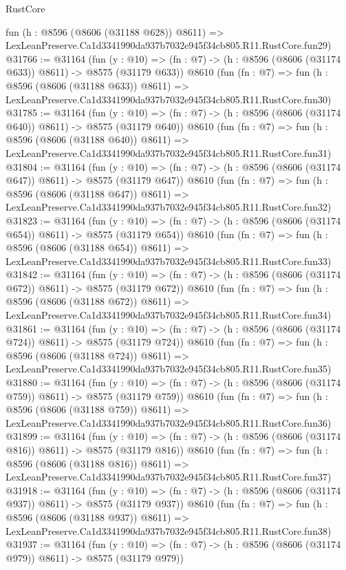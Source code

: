 \begin{lexlean}{RustCore}
\begin{coremodule}
    fun (h : @8596 (@8606 (@31188 @628)) @8611) =>
    LexLeanPreserve.Ca1d3341990da937b7032e945f34cb805.R11.RustCore.fun29)
@31766 := @31164
    (fun (y : @10) => (fn : @7) -> (h : @8596 (@8606 (@31174 @633)) @8611) -> @8575 (@31179 @633))
    @8610
    (fun (fn : @7) =>
    fun (h : @8596 (@8606 (@31188 @633)) @8611) =>
    LexLeanPreserve.Ca1d3341990da937b7032e945f34cb805.R11.RustCore.fun30)
@31785 := @31164
    (fun (y : @10) => (fn : @7) -> (h : @8596 (@8606 (@31174 @640)) @8611) -> @8575 (@31179 @640))
    @8610
    (fun (fn : @7) =>
    fun (h : @8596 (@8606 (@31188 @640)) @8611) =>
    LexLeanPreserve.Ca1d3341990da937b7032e945f34cb805.R11.RustCore.fun31)
@31804 := @31164
    (fun (y : @10) => (fn : @7) -> (h : @8596 (@8606 (@31174 @647)) @8611) -> @8575 (@31179 @647))
    @8610
    (fun (fn : @7) =>
    fun (h : @8596 (@8606 (@31188 @647)) @8611) =>
    LexLeanPreserve.Ca1d3341990da937b7032e945f34cb805.R11.RustCore.fun32)
@31823 := @31164
    (fun (y : @10) => (fn : @7) -> (h : @8596 (@8606 (@31174 @654)) @8611) -> @8575 (@31179 @654))
    @8610
    (fun (fn : @7) =>
    fun (h : @8596 (@8606 (@31188 @654)) @8611) =>
    LexLeanPreserve.Ca1d3341990da937b7032e945f34cb805.R11.RustCore.fun33)
@31842 := @31164
    (fun (y : @10) => (fn : @7) -> (h : @8596 (@8606 (@31174 @672)) @8611) -> @8575 (@31179 @672))
    @8610
    (fun (fn : @7) =>
    fun (h : @8596 (@8606 (@31188 @672)) @8611) =>
    LexLeanPreserve.Ca1d3341990da937b7032e945f34cb805.R11.RustCore.fun34)
@31861 := @31164
    (fun (y : @10) => (fn : @7) -> (h : @8596 (@8606 (@31174 @724)) @8611) -> @8575 (@31179 @724))
    @8610
    (fun (fn : @7) =>
    fun (h : @8596 (@8606 (@31188 @724)) @8611) =>
    LexLeanPreserve.Ca1d3341990da937b7032e945f34cb805.R11.RustCore.fun35)
@31880 := @31164
    (fun (y : @10) => (fn : @7) -> (h : @8596 (@8606 (@31174 @759)) @8611) -> @8575 (@31179 @759))
    @8610
    (fun (fn : @7) =>
    fun (h : @8596 (@8606 (@31188 @759)) @8611) =>
    LexLeanPreserve.Ca1d3341990da937b7032e945f34cb805.R11.RustCore.fun36)
@31899 := @31164
    (fun (y : @10) => (fn : @7) -> (h : @8596 (@8606 (@31174 @816)) @8611) -> @8575 (@31179 @816))
    @8610
    (fun (fn : @7) =>
    fun (h : @8596 (@8606 (@31188 @816)) @8611) =>
    LexLeanPreserve.Ca1d3341990da937b7032e945f34cb805.R11.RustCore.fun37)
@31918 := @31164
    (fun (y : @10) => (fn : @7) -> (h : @8596 (@8606 (@31174 @937)) @8611) -> @8575 (@31179 @937))
    @8610
    (fun (fn : @7) =>
    fun (h : @8596 (@8606 (@31188 @937)) @8611) =>
    LexLeanPreserve.Ca1d3341990da937b7032e945f34cb805.R11.RustCore.fun38)
@31937 := @31164
    (fun (y : @10) => (fn : @7) -> (h : @8596 (@8606 (@31174 @979)) @8611) -> @8575 (@31179 @979))

\end{coremodule}
\end{lexlean}
